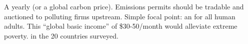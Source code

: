 
\bbsp \ip {}
\ip \quad A yearly  \pause (or a global carbon price).
\ip Emissions permits should be tradable and auctioned to polluting firms upstream.
\ip {}
\ip \quad Simple focal point: an  for all human adults.
\ip \quad This ``global basic income'' of \$30-50/month would alleviate extreme poverty. 
\ip {}   in the 20 countries surveyed.
\ee    